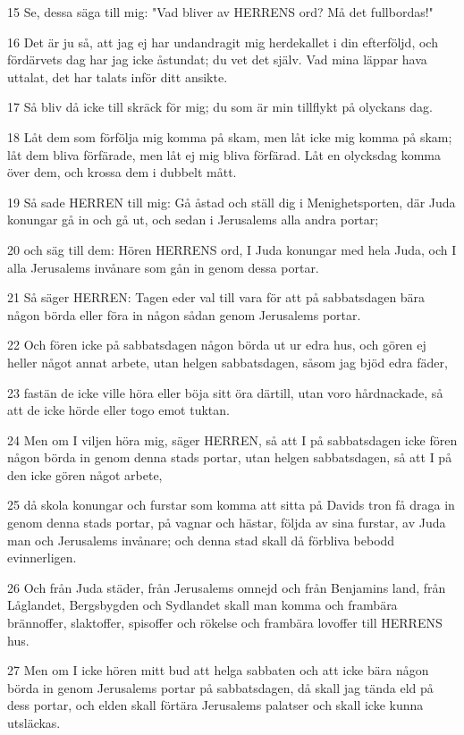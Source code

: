 \par 15 Se, dessa säga till mig: "Vad bliver av HERRENS ord? Må det fullbordas!"
\par 16 Det är ju så, att jag ej har undandragit mig herdekallet i din efterföljd, och fördärvets dag har jag icke åstundat; du vet det själv. Vad mina läppar hava uttalat, det har talats inför ditt ansikte.
\par 17 Så bliv då icke till skräck för mig; du som är min tillflykt på olyckans dag.
\par 18 Låt dem som förfölja mig komma på skam, men låt icke mig komma på skam; låt dem bliva förfärade, men låt ej mig bliva förfärad. Låt en olycksdag komma över dem, och krossa dem i dubbelt mått.
\par 19 Så sade HERREN till mig: Gå åstad och ställ dig i Menighetsporten, där Juda konungar gå in och gå ut, och sedan i Jerusalems alla andra portar;
\par 20 och säg till dem: Hören HERRENS ord, I Juda konungar med hela Juda, och I alla Jerusalems invånare som gån in genom dessa portar.
\par 21 Så säger HERREN: Tagen eder val till vara för att på sabbatsdagen bära någon börda eller föra in någon sådan genom Jerusalems portar.
\par 22 Och fören icke på sabbatsdagen någon börda ut ur edra hus, och gören ej heller något annat arbete, utan helgen sabbatsdagen, såsom jag bjöd edra fäder,
\par 23 fastän de icke ville höra eller böja sitt öra därtill, utan voro hårdnackade, så att de icke hörde eller togo emot tuktan.
\par 24 Men om I viljen höra mig, säger HERREN, så att I på sabbatsdagen icke fören någon börda in genom denna stads portar, utan helgen sabbatsdagen, så att I på den icke gören något arbete,
\par 25 då skola konungar och furstar som komma att sitta på Davids tron få draga in genom denna stads portar, på vagnar och hästar, följda av sina furstar, av Juda man och Jerusalems invånare; och denna stad skall då förbliva bebodd evinnerligen.
\par 26 Och från Juda städer, från Jerusalems omnejd och från Benjamins land, från Låglandet, Bergsbygden och Sydlandet skall man komma och frambära brännoffer, slaktoffer, spisoffer och rökelse och frambära lovoffer till HERRENS hus.
\par 27 Men om I icke hören mitt bud att helga sabbaten och att icke bära någon börda in genom Jerusalems portar på sabbatsdagen, då skall jag tända eld på dess portar, och elden skall förtära Jerusalems palatser och skall icke kunna utsläckas.

